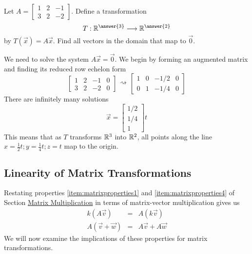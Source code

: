 \documentclass{ximera}
\begin{document}
\begin{example}\label{ex:matrixTrans1}
    Let $A=\begin{bmatrix}1&2&-1\\3&2&-2\end{bmatrix}$.  Define a transformation 
    $$T:\RR^{\answer{3}}\longrightarrow\RR^{\answer{2}}$$ by 
    $T(\vec{x})=A\vec{x}$.  Find all vectors in the domain that map to $\vec{0}$.
\begin{explanation}
    We need to solve the system $A\vec{x}=\vec{0}$.  We begin by forming an augmented matrix and finding its reduced row echelon form
    $$\left[\begin{array}{ccc|c} 
 1&2&-1&0\\3&2&-2&0
 \end{array}\right]\begin{array}{c}
 \\
 \rightsquigarrow\\
 \\
 \end{array}\left[\begin{array}{ccc|c} 
 1&0&-1/2&0\\0&1&-1/4&0
 \end{array}\right]$$
 There are infinitely many solutions
 $$\vec{x}=\begin{bmatrix}1/2\\1/4\\1\end{bmatrix}t$$
 This means that as $T$ transforms $\mathbb{R}^3$ into $\mathbb{R}^2$, all points along the line $x=\frac{1}{2}t; y=\frac{1}{4}t; z=t$ map to the origin.
\end{explanation}    
\end{example}

\subsection*{Linearity of Matrix Transformations}
Restating properties \ref{item:matrixproperties1} and \ref{item:matrixproperties4} of Section \href{https://ximera.osu.edu/oerlinalg/LinearAlgebra/MAT-0020/main}{Matrix Multiplication} in terms of matrix-vector multiplication gives us
\begin{eqnarray}\label{eq:linearityConstant}
 k(A\vec{v})&=&A(k\vec{v})\\
    A(\vec{v}+\vec{w})&=&A\vec{v}+A\vec{w}\label{eq:linearityAdd}
   \end{eqnarray}
We will now examine the implications of these properties for matrix transformations.
\end{document}

